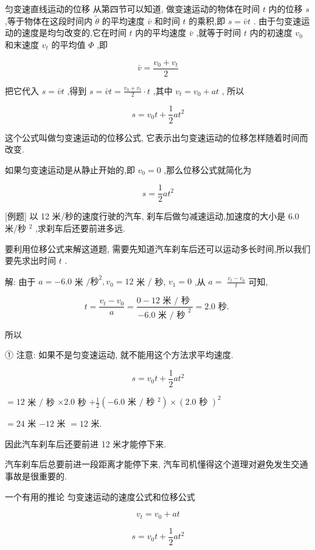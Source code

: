 \documentclass[10pt]{article}
\begin{document}
匀变速直线运动的位移 从第四节可以知道, 做变速运动的物体在时间 \(t\) 内的位移 \(s\) ,等于物体在这段时间内 \(\widetilde{\theta }\) 的平均速度 \(\bar{v}\) 和时间 \(t\) 的乘积,即 \(s = \bar{v}t\) . 由于匀变速运动的速度是均匀改变的,它在时间 \(t\) 内的平均速度 \(\bar{v}\) ,就等于时间 \(t\) 内的初速度 \({v}_{0}\) 和末速度 \({v}_{t}\) 的平均值 \(\Phi\) ,即

\[
\bar{v} = \frac{{v}_{0} + {v}_{t}}{2}
\]

把它代入 \(s = \bar{v}t\) ,得到 \(s = \bar{v}t = \frac{{v}_{0} + {v}_{t}}{2} \cdot t\) ,其中 \({v}_{t} = {v}_{0} + {at}\) , 所以

\[
s = {v}_{0}t + \frac{1}{2}a{t}^{2}
\]

这个公式叫做匀变速运动的位移公式, 它表示出匀变速运动的位移怎样随着时间而改变.

如果匀变速运动是从静止开始的,即 \({v}_{0} = 0\) ,那么位移公式就简化为

\[
s = \frac{1}{2}a{t}^{2}
\]

[例题] 以 12 米/秒的速度行驶的汽车, 刹车后做匀减速运动,加速度的大小是 6.0 米/秒 \({}^{2}\) ,求刹车后还要前进多远.

要利用位移公式来解这道题, 需要先知道汽车刹车后还可以运动多长时间,所以我们要先求出时间 \(t\) .

解: 由于 \(a = - {6.0}\) 米 \(/{\text{秒}}^{2},{v}_{0} = {12}\) 米 \(/\) 秒, \({v}_{1} = 0\) ,从 \(a =\) \(\frac{{v}_{t} - {v}_{0}}{t}\) 可知,

\[
t = \frac{{v}_{t} - {v}_{0}}{a} = \frac{0 - {12}\text{ 米 }/\text{ 秒 }}{-{6.0}\text{ 米 }/{\text{ 秒 }}^{2}} = {2.0}\text{ 秒. }
\]

所以

① 注意: 如果不是匀变速运动, 就不能用这个方法求平均速度.

\[
s = {v}_{0}t + \frac{1}{2}a{t}^{2}
\]

\(= {12}\) 米 \(/\) 秒 \(\times {2.0}\) 秒 \(+ \frac{1}{2}\left( {-{6.0}\text{ 米 }/\text{ 秒 }{}^{2}}\right) \times {\left( {2.0}\text{ 秒 }\right) }^{2}\)

\(= {24}\) 米 \(- {12}\) 米 \(= {12}\) 米.

因此汽车刹车后还要前进 12 米才能停下来.

汽车刹车后总要前进一段距离才能停下来, 汽车司机懂得这个道理对避免发生交通事故是很重要的.

一个有用的推论 匀变速运动的速度公式和位移公式

\[
{v}_{t} = {v}_{0} + {at} \tag{1}
\]

\[
s = {v}_{0}t + \frac{1}{2}a{t}^{2} \tag{2}
\]
\end{document}
